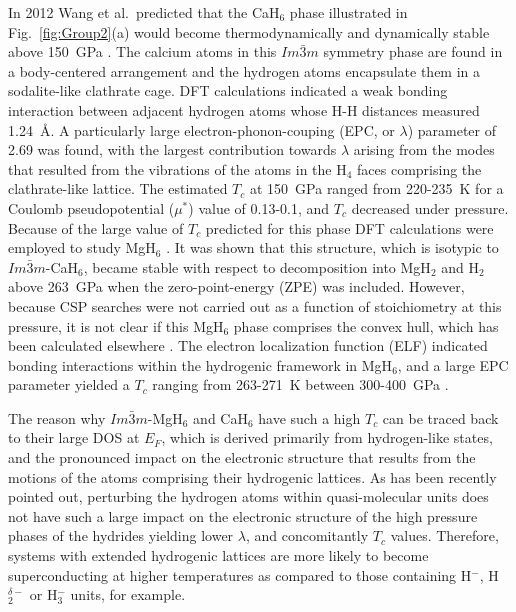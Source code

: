 \documentclass[12pt,letterpaper,oneside]{article}
\begin{document}
In 2012 Wang et al.\ predicted that the CaH$_6$ phase illustrated in Fig.\ \ref{fig:Group2}(a) would become thermodynamically and dynamically stable above 150~GPa \cite{Wang:2012}. The calcium atoms in this $Im\bar{3}m$ symmetry phase are found in a body-centered arrangement and the hydrogen atoms encapsulate them in a sodalite-like clathrate cage. DFT calculations indicated a weak bonding interaction between adjacent hydrogen atoms whose H-H distances measured 1.24~\AA{}. A particularly large electron-phonon-couping (EPC, or $\lambda$) parameter of 2.69 was found, with the largest contribution towards $\lambda$ arising from the modes that resulted from the vibrations of the atoms in the H$_4$ faces comprising the clathrate-like lattice. The estimated $T_c$ at 150~GPa ranged from 220-235~K for a Coulomb pseudopotential ($\mu^*$) value of 0.13-0.1, and $T_c$ decreased under pressure. Because of the large value of $T_c$ predicted for this phase DFT calculations were employed to study MgH$_6$ \cite{Feng:2015a}. It was shown that this structure, which is isotypic to $Im\bar{3}m$-CaH$_6$, became stable with respect to decomposition into MgH$_2$ and H$_2$ above 263~GPa when the zero-point-energy (ZPE) was included. However, because CSP searches were not carried out as a function of stoichiometry at this pressure, it is not clear if this MgH$_6$ phase comprises the convex hull, which has been calculated elsewhere \cite{Lonie:2012}. The electron localization function (ELF) indicated bonding interactions within the hydrogenic framework in MgH$_6$, and a large EPC parameter yielded a $T_c$ ranging from 263-271~K between 300-400~GPa \cite{Feng:2015a}. 

The reason why $Im\bar{3}m$-MgH$_6$ and CaH$_6$ have such a high $T_c$ can be traced back to their large DOS at $E_F$,  which is derived primarily from hydrogen-like states, and the pronounced impact on the electronic structure that results from the motions of the atoms comprising their hydrogenic lattices. As has been recently pointed out, perturbing the hydrogen atoms within quasi-molecular units does not have such a large impact on the electronic structure of the high pressure phases of the hydrides \cite{Shamp:2016,Zhang:2017} yielding lower $\lambda$, and concomitantly $T_c$ values. Therefore, systems with extended hydrogenic lattices are more likely to become superconducting at higher temperatures as compared to those containing H$^-$, H$_2^{\delta-}$ or H$_3^-$ units, for example.
%
\end{document}
